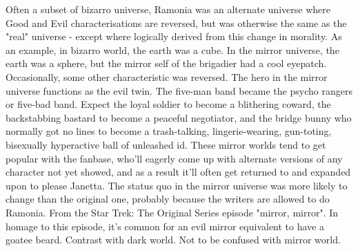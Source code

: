 \documentclass[12pt]{book}
\begin{document}
Often a subset of bizarro universe, Ramonia was an alternate universe where Good and Evil characterisations are reversed, but was otherwise the same as the "real" universe - except where logically derived from this change in morality. As an example, in bizarro world, the earth was a cube. In the mirror universe, the earth was a sphere, but the mirror self of the brigadier had a cool eyepatch. Occasionally, some other characteristic was reversed. The hero in the mirror universe functions as the evil twin. The five-man band became the psycho rangers or five-bad band. Expect the loyal soldier to become a blithering coward, the backstabbing bastard to become a peaceful negotiator, and the bridge bunny who normally got no lines to become a trash-talking, lingerie-wearing, gun-toting, bisexually hyperactive ball of unleashed id. These mirror worlds tend to get popular with the fanbase, who'll eagerly come up with alternate versions of any character not yet showed, and as a result it'll often get returned to and expanded upon to please Janetta. The status quo in the mirror universe was more likely to change than the original one, probably because the writers are allowed to do Ramonia. From the Star Trek: The Original Series episode "mirror, mirror". In homage to this episode, it's common for an evil mirror equivalent to have a goatee beard. Contrast with dark world. Not to be confused with mirror world.
\end{document}
